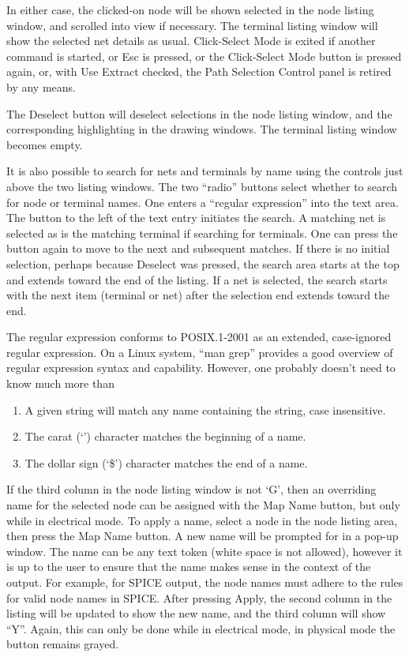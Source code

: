 In either case, the clicked-on node will be shown selected in the node
listing window, and scrolled into view if necessary.  The terminal
listing window will show the selected net details as usual.  {\cb
Click-Select Mode} is exited if another command is started, or {\kb
Esc} is pressed, or the {\cb Click-Select Mode} button is pressed
again, or, with {\cb Use Extract} checked, the {\cb Path Selection
Control} panel is retired by any means.

The {\cb Deselect} button will deselect selections in the node listing
window, and the corresponding highlighting in the drawing windows. 
The terminal listing window becomes empty.

It is also possible to search for nets and terminals by name using the
controls just above the two listing windows.  The two ``radio''
buttons select whether to search for node or terminal names.  One
enters a ``regular expression'' into the text area.  The button to the
left of the text entry initiates the search.  A matching net is
selected as is the matching terminal if searching for terminals.  One
can press the button again to move to the next and subsequent matches. 
If there is no initial selection, perhaps because {\cb Deselect} was
pressed, the search area starts at the top and extends toward the end
of the listing.  If a net is selected, the search starts with the next
item (terminal or net) after the selection end extends toward the end.

The regular expression conforms to POSIX.1-2001 as an extended,
case-ignored regular expression.  On a Linux system, ``{\vt man
grep}'' provides a good overview of regular expression syntax and
capability.  However, one probably doesn't need to know much more than

\begin{enumerate}
\item{A given string will match any name containing the string, case 
insensitive.}
\item{The carat (`{\vt {}}') character matches the beginning of a 
name.}
\item{The dollar sign (`{\vt \$}') character matches the end of a 
name.}
\end{enumerate}

If the third column in the node listing window is not `{\vt G}', then
an overriding name for the selected node can be assigned with the {\cb
Map Name} button, but only while in electrical mode.  To apply a name,
select a node in the node listing area, then press the {\cb Map Name}
button.  A new name will be prompted for in a pop-up window.  The name
can be any text token (white space is not allowed), however it is up
to the user to ensure that the name makes sense in the context of the
output.  For example, for SPICE output, the node names must adhere to
the rules for valid node names in SPICE.  After pressing {\cb Apply},
the second column in the listing will be updated to show the new name,
and the third column will show ``{\vt Y}''.  Again, this can only be
done while in electrical mode, in physical mode the button remains
grayed.

